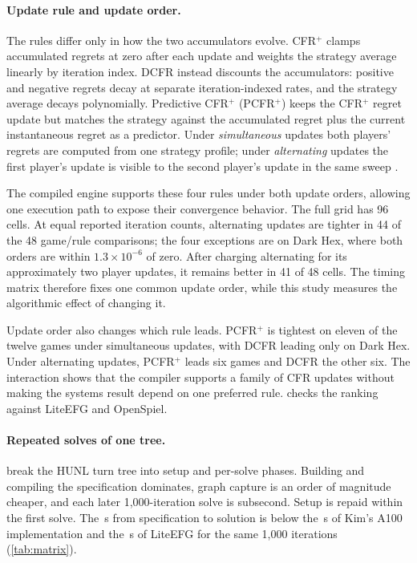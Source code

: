 \paragraph{Update rule and update order.}
\label{sec:rules}
The rules differ only in how the two accumulators evolve. CFR$^{+}$
\cite{tammelin2014solving} clamps accumulated regrets at zero after each update and
weights the strategy average linearly by iteration index. DCFR
\cite{brown2019solving} instead discounts the accumulators: positive and negative
regrets decay at separate iteration-indexed rates, and the strategy average decays
polynomially. Predictive CFR$^{+}$ (PCFR$^{+}$) \cite{farina2021faster} keeps the
CFR$^{+}$ regret update but matches the strategy against the accumulated regret plus
the current instantaneous regret as a predictor. Under \emph{simultaneous} updates
both players' regrets are computed from one strategy profile; under
\emph{alternating} updates the first player's update is visible to the second
player's update in the same sweep \cite{burch2019revisiting}.

The compiled engine supports these four rules under both update orders, allowing one
execution path to expose their convergence behavior. The full grid has 96 cells. At
equal reported iteration counts, alternating updates are tighter in 44 of the 48
game/rule comparisons; the four exceptions are on Dark Hex, where both orders are
within $1.3\times10^{-6}$ of zero. After charging alternating for its approximately
two player updates, it remains better in 41 of 48 cells. The timing matrix therefore fixes
one common update order, while this study measures the algorithmic effect of
changing it.

Update order also changes which rule leads. PCFR$^{+}$ is tightest on eleven of the
twelve games under simultaneous updates, with DCFR leading only on Dark Hex. Under
alternating updates, PCFR$^{+}$ leads six games and DCFR the other six. The interaction shows that the compiler
supports a family of CFR updates without making the systems result depend on one
preferred rule.  checks the ranking against LiteEFG and OpenSpiel.



\paragraph{Repeated solves of one tree.}
\label{sec:hunl}
 break the HUNL turn tree into setup and per-solve
phases. Building and compiling the specification dominates, graph capture is an order
of magnitude cheaper, and each later 1{,}000-iteration solve is subsecond. Setup is
repaid within the first solve. The \turnFirstSolveSec\,s from specification to
solution is below the \turnKimThousandSec\,s of Kim's A100 implementation and the
\turnLiteThousandSec\,s of LiteEFG for the same 1{,}000 iterations
(\cref{tab:matrix}).

